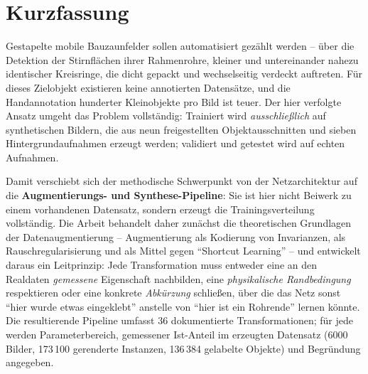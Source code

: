 \chapter*{Kurzfassung}
\thispagestyle{plain}

Gestapelte mobile Bauzaunfelder sollen automatisiert gezählt werden -- über die
Detektion der Stirnflächen ihrer Rahmenrohre, kleiner und untereinander nahezu
identischer Kreisringe, die dicht gepackt und wechselseitig verdeckt auftreten.
Für dieses Zielobjekt existieren keine annotierten Datensätze, und die
Handannotation hunderter Kleinobjekte pro Bild ist teuer. Der hier verfolgte
Ansatz umgeht das Problem vollständig: Trainiert wird \emph{ausschließlich} auf
synthetischen Bildern, die aus neun freigestellten Objektausschnitten und sieben
Hintergrundaufnahmen erzeugt werden; validiert und getestet wird auf echten
Aufnahmen.

Damit verschiebt sich der methodische Schwerpunkt von der Netzarchitektur auf die
\textbf{Augmentierungs- und Synthese-Pipeline}: Sie ist hier nicht Beiwerk zu
einem vorhandenen Datensatz, sondern erzeugt die Trainingsverteilung vollständig.
Die Arbeit behandelt daher zunächst die theoretischen Grundlagen der
Datenaugmentierung -- Augmentierung als Kodierung von Invarianzen, als
Rauschregularisierung und als Mittel gegen \enquote{Shortcut Learning} -- und
entwickelt daraus ein Leitprinzip: Jede Transformation muss entweder eine an den
Realdaten \emph{gemessene} Eigenschaft nachbilden, eine \emph{physikalische
Randbedingung} respektieren oder eine konkrete \emph{Abkürzung} schließen, über
die das Netz sonst \enquote{hier wurde etwas eingeklebt} anstelle von \enquote{hier
ist ein Rohrende} lernen könnte. Die resultierende Pipeline umfasst 36
dokumentierte Transformationen; für jede werden Parameterbereich, gemessener
Ist-Anteil im erzeugten Datensatz (6000 Bilder, 173\,100 gerenderte Instanzen,
136\,384 gelabelte Objekte) und Begründung angegeben.

